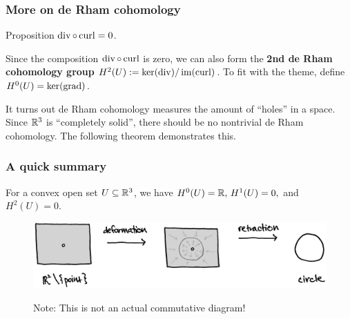 \documentclass[xcolor=dvipsnames]{beamer}
\begin{document}
    \begin{frame}
    \frametitle{More on de Rham cohomology} 
\begin{block}{Proposition} 
$\operatorname{div} \circ \operatorname{curl} =0$.    
\end{block}
    \begin{definition}
    Since the composition $\operatorname{div} \circ \operatorname{curl}$ is zero, we can also form the \textbf{2nd de Rham cohomology group} $H^2(U):=\ker (\operatorname{div}) / \operatorname{im}(\operatorname{curl})$. To fit with the theme, define $H^0(U)=\ker (\operatorname{grad})$. 
    \end{definition}%
    It turns out de Rham cohomology measures the amount of ``holes'' in a space. Since $\mathbb{R}^3$ is ``completely solid'', there should be no nontrivial de Rham cohomology. The following theorem demonstrates this.
    \end{frame}
    \begin{frame}[fragile]
        \frametitle{A quick summary} 
    \begin{theorem}
        For a convex open set $U \subseteq \mathbb{R}^3$, we have $H^0(U)=\mathbb{R},\,H^1(U)=0,$ and $H^2(U)=0$.
    \end{theorem}\pause
    \begin{figure}[H]
    \centering
     \includegraphics[width=0.6\linewidth]{homotopy_circ.jpg}
    \end{figure}\pause
        \begin{figure}[H]
    Note: This is not an actual commutative diagram!
        \end{figure}
    \end{frame}
\end{document}
